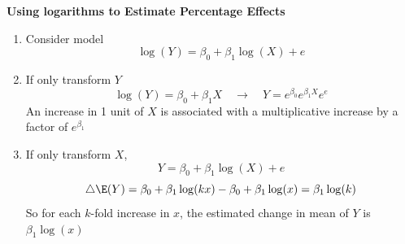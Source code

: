 \documentclass[11pt]{article}
\begin{document}
\begin{defn*}
    \textbf{Using logarithms to Estimate Percentage Effects} \\
    \begin{enumerate}
        \item Consider model 
        \[
            \log(Y) = \beta_0 + \beta_1 \log(X) + e
        \]
        \item If only transform $Y$
        \[
            \log(Y)  = \beta_0 + \beta_1 X \quad \to\quad Y = e^{\beta_0} e^{\beta_1 X}e^e
        \]
        An increase in 1 unit of $X$ is associated with a multiplicative increase by a factor of $e^{\beta_1}$
        \item If only transform $X$, 
        \[
            Y = \beta_0 + \beta_1 \log(X) + e 
        \]
        \[
            \triangle \E(Y) = \beta_0 + \beta_1 \log(kx) - \beta_0 + \beta_1 \log(x) = \beta_1 \log(k)
        \]
        So for each $k$-fold increase in $x$, the estimated change in mean of $Y$ is $\beta_1 \log(x)$
    \end{enumerate}
\end{defn*}
\end{document}
